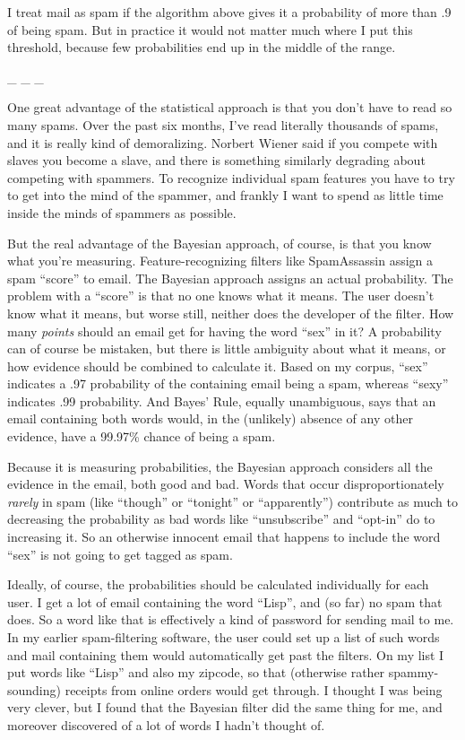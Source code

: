 \documentclass[12pt]{book}
\begin{document}
I treat mail as spam if the algorithm above gives it a probability of
more than .9 of being spam. But in practice it would not matter much
where I put this threshold, because few probabilities end up in the
middle of the range.

\_ \_ \_

One great advantage of the statistical approach is that you don't have
to read so many spams. Over the past six months, I've read literally
thousands of spams, and it is really kind of demoralizing. Norbert
Wiener said if you compete with slaves you become a slave, and there is
something similarly degrading about competing with spammers. To
recognize individual spam features you have to try to get into the mind
of the spammer, and frankly I want to spend as little time inside the
minds of spammers as possible.

But the real advantage of the Bayesian approach, of course, is that you
know what you're measuring. Feature-recognizing filters like
SpamAssassin assign a spam ``score'' to email. The Bayesian approach
assigns an actual probability. The problem with a ``score'' is that no
one knows what it means. The user doesn't know what it means, but worse
still, neither does the developer of the filter. How many \emph{points}
should an email get for having the word ``sex'' in it? A probability can
of course be mistaken, but there is little ambiguity about what it
means, or how evidence should be combined to calculate it. Based on my
corpus, ``sex'' indicates a .97 probability of the containing email
being a spam, whereas ``sexy'' indicates .99 probability. And Bayes'
Rule, equally unambiguous, says that an email containing both words
would, in the (unlikely) absence of any other evidence, have a 99.97\%
chance of being a spam.

Because it is measuring probabilities, the Bayesian approach considers
all the evidence in the email, both good and bad. Words that occur
disproportionately \emph{rarely} in spam (like ``though'' or ``tonight''
or ``apparently'') contribute as much to decreasing the probability as
bad words like ``unsubscribe'' and ``opt-in'' do to increasing it. So an
otherwise innocent email that happens to include the word ``sex'' is not
going to get tagged as spam.

Ideally, of course, the probabilities should be calculated individually
for each user. I get a lot of email containing the word ``Lisp'', and
(so far) no spam that does. So a word like that is effectively a kind of
password for sending mail to me. In my earlier spam-filtering software,
the user could set up a list of such words and mail containing them
would automatically get past the filters. On my list I put words like
``Lisp'' and also my zipcode, so that (otherwise rather spammy-sounding)
receipts from online orders would get through. I thought I was being
very clever, but I found that the Bayesian filter did the same thing for
me, and moreover discovered of a lot of words I hadn't thought of.
\end{document}
